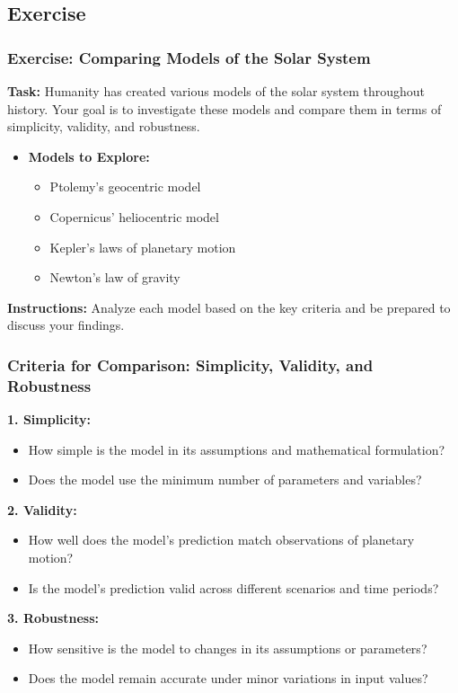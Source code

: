 \documentclass{beamer}
\begin{document}
\subsection{Exercise}
%
\begin{frame}
\frametitle{Exercise: Comparing Models of the Solar System}
\textbf{Task:} Humanity has created various models of the solar system throughout history. Your goal is to investigate these models and compare them in terms of simplicity, validity, and robustness.

\begin{itemize}
    \item \textbf{Models to Explore:}
    \begin{itemize}
        \item Ptolemy's geocentric model
        \item Copernicus' heliocentric model
        \item Kepler's laws of planetary motion
        \item Newton's law of gravity
    \end{itemize}
\end{itemize}

\textbf{Instructions:} Analyze each model based on the key criteria and be prepared to discuss your findings.
\end{frame}
%
\begin{frame}
\frametitle{Criteria for Comparison: Simplicity, Validity, and Robustness}
\scriptsize{
\textbf{1. Simplicity:}
\begin{itemize}
    \item How simple is the model in its assumptions and mathematical formulation?
    \item Does the model use the minimum number of parameters and variables?
\end{itemize}

\textbf{2. Validity:}
\begin{itemize}
    \item How well does the model's prediction match observations of planetary motion?
    \item Is the model's prediction valid across different scenarios and time periods?
\end{itemize}

\textbf{3. Robustness:}
\begin{itemize}
    \item How sensitive is the model to changes in its assumptions or parameters?
    \item Does the model remain accurate under minor variations in input values?
\end{itemize}}
\end{frame}
%
\end{document}
